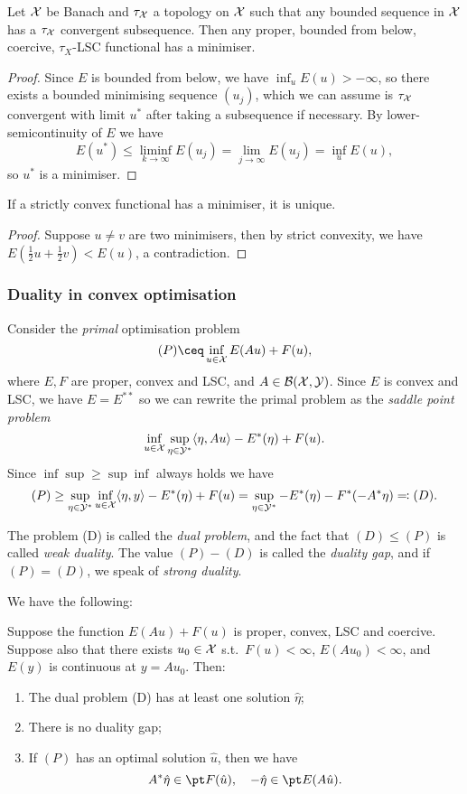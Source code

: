 \begin{theorem}
	Let $\mathcal X$ be Banach and $\tau_\mathcal X$ a topology on $\mathcal X$ such that any bounded sequence in $\mathcal X$ has a $\tau_\mathcal X$ convergent subsequence. Then any proper, bounded from below, coercive, $\tau_X$-LSC functional has a minimiser.  
\end{theorem}

\begin{proof}
	Since $E$ is bounded from below, we have $\inf_u E(u) > -\infty$, so there exists a bounded minimising sequence $(u_j)$, which we can assume is $\tau_\mathcal X$ convergent with limit $u^*$ after taking a subsequence if necessary. By lower-semicontinuity of $E$ we have
	\[
	E(u^*) \leq \liminf_{k\to\infty} E(u_j) = \lim_{j\to\infty} E(u_j) = \inf_u E(u),
	\]
	so $u^*$ is a minimiser. 
\end{proof}

\begin{theorem}
	If a strictly convex functional has a minimiser, it is unique. 
\end{theorem}

\begin{proof}
	Suppose $u \neq v$ are two minimisers, then by strict convexity, we have $E(\frac12 u + \frac12 v) < E(u)$, a contradiction. 
\end{proof}

\subsubsection{Duality in convex optimisation}
Consider the \emph{primal} optimisation problem 
\[
(P) \ceq \inf_{u \in \XX} E(Au) + F(u),
\]
where $E, F$ are proper, convex and LSC, and $A \in \mathcal B(\mathcal X, \mathcal Y)$. Since $E$ is convex and LSC, we have $E = E^{**}$ so we can rewrite the primal problem as the \emph{saddle point problem}
\[
\inf_{u \in \mathcal X} \sup_{\eta \in \mathcal Y^*} \langle\eta, Au\rangle - E^*(\eta) + F(u).
\]
Since $\inf\sup \geq \sup\inf$ always holds we have
\[
(P) \geq \sup_{\eta \in \mathcal Y^*} \inf_{u \in \mathcal X} \langle\eta, y\rangle - E^*(\eta) + F(u) = \sup_{\eta \in \mathcal Y^*} -E^*(\eta) - F^*(-A^*\eta) \eqqcolon (D). 
\] 

The problem (D) is called the \emph{dual problem}, and the fact that $(D) \leq (P)$ is called \emph{weak duality}. The value $(P) - (D)$ is called the \emph{duality gap}, and if $(P) = (D)$, we speak of \emph{strong duality}. 

We have the following:
\begin{theorem}
	Suppose the function $E(Au) + F(u)$ is proper, convex, LSC and coercive. Suppose also that there exists $u_0 \in \mathcal X$ s.t.\ $F(u)< \infty$, $E(Au_0) < \infty$, and $E(y)$ is continuous at $y = A u_0$. Then:
	\begin{enumerate}
		\item The dual problem (D) has at least one solution $\hat\eta$;
		\item There is no duality gap;
		\item If $(P)$ has an optimal solution $\hat u$, then we have
		\[
		A^*\hat\eta \in \pt F(\hat u), \quad -\hat\eta \in \pt E(A\hat u). 
		\]
	\end{enumerate}
\end{theorem}